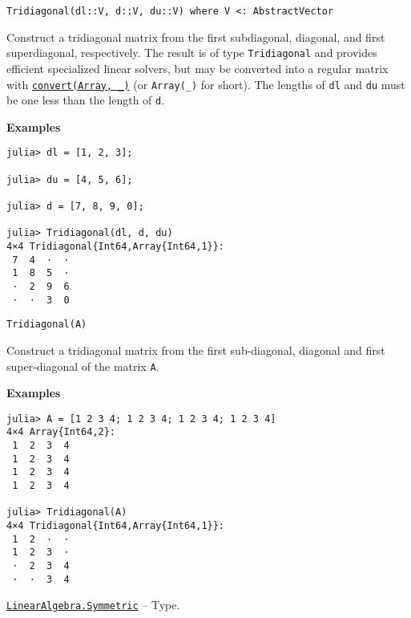 \begin{adjustwidth}{2em}{0pt}


\begin{verbatim}
Tridiagonal(dl::V, d::V, du::V) where V <: AbstractVector
\end{verbatim}

Construct a tridiagonal matrix from the first subdiagonal, diagonal, and first superdiagonal, respectively. The result is of type \texttt{Tridiagonal} and provides efficient specialized linear solvers, but may be converted into a regular matrix with \hyperlink{1846942650946171605}{\texttt{convert(Array, \_)}} (or \texttt{Array(\_)} for short). The lengths of \texttt{dl} and \texttt{du} must be one less than the length of \texttt{d}.

\textbf{Examples}


\begin{verbatim}
julia> dl = [1, 2, 3];

julia> du = [4, 5, 6];

julia> d = [7, 8, 9, 0];

julia> Tridiagonal(dl, d, du)
4×4 Tridiagonal{Int64,Array{Int64,1}}:
 7  4  ⋅  ⋅
 1  8  5  ⋅
 ⋅  2  9  6
 ⋅  ⋅  3  0
\end{verbatim}




\begin{lstlisting}
Tridiagonal(A)
\end{lstlisting}

Construct a tridiagonal matrix from the first sub-diagonal, diagonal and first super-diagonal of the matrix \texttt{A}.

\textbf{Examples}


\begin{verbatim}
julia> A = [1 2 3 4; 1 2 3 4; 1 2 3 4; 1 2 3 4]
4×4 Array{Int64,2}:
 1  2  3  4
 1  2  3  4
 1  2  3  4
 1  2  3  4

julia> Tridiagonal(A)
4×4 Tridiagonal{Int64,Array{Int64,1}}:
 1  2  ⋅  ⋅
 1  2  3  ⋅
 ⋅  2  3  4
 ⋅  ⋅  3  4
\end{verbatim}



\end{adjustwidth}
\hypertarget{17683454167504168761}{} 
\hyperlink{17683454167504168761}{\texttt{LinearAlgebra.Symmetric}}  -- {Type.}

